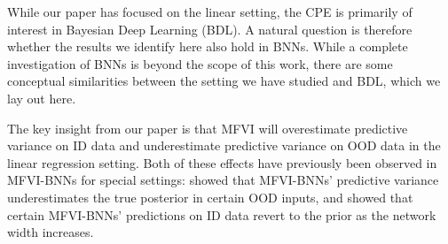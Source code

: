 \documentclass{article}
\theoremstyle{plain}
\theoremstyle{definition}
\theoremstyle{remark}
\theoremstyle{plain}
\begin{document}


While our paper has focused on the linear setting, the CPE is primarily of interest in Bayesian Deep Learning (BDL). A natural question is therefore whether the results we identify here also hold in BNNs. While a complete investigation of BNNs is beyond the scope of this work, there are some conceptual similarities between the setting we have studied and BDL, which we lay out here. 

The key insight from our paper is that MFVI will overestimate predictive variance on ID data and underestimate predictive variance on OOD data in the linear regression setting. Both of these effects have previously been observed in MFVI-BNNs for special settings: \citet{foong2019between} showed that MFVI-BNNs' predictive variance underestimates the true posterior in certain OOD inputs, and \citet{coker2022wide} showed that certain MFVI-BNNs' predictions on ID data revert to the prior as the network width increases.
\end{document}
